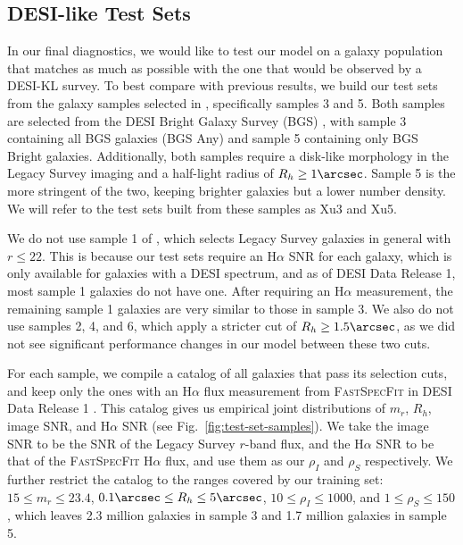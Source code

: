 \subsection{DESI-like Test Sets}
\label{ssec:test-set}

In our final diagnostics, we would like to test our model on a galaxy population that matches as much as possible with the one that would be observed by a DESI-KL survey. To best compare with previous results, we build our test sets from the galaxy samples selected in \citep{KLDESI}, specifically samples 3 and 5. Both samples are selected from the DESI Bright Galaxy Survey (BGS) \citep{BGS}, with sample 3 containing all BGS galaxies (BGS Any) and sample 5 containing only BGS Bright galaxies. Additionally, both samples require a disk-like morphology in the Legacy Survey imaging \citep{LSImaging} and a half-light radius of $R_h \geq 1\arcsec$. Sample 5 is the more stringent of the two, keeping brighter galaxies but a lower number density. We will refer to the test sets built from these samples as Xu3 and Xu5.

We do not use sample 1 of \citep{KLDESI}, which selects Legacy Survey galaxies in general with $r \leq 22$. This is because our test sets require an H$\alpha$ SNR for each galaxy, which is only available for galaxies with a DESI spectrum, and as of DESI Data Release 1, most sample 1 galaxies do not have one. After requiring an H$\alpha$ measurement, the remaining sample 1 galaxies are very similar to those in sample 3. We also do not use samples 2, 4, and 6, which apply a stricter cut of $R_h \geq 1.5\arcsec$, as we did not see significant performance changes in our model between these two cuts.

For each sample, we compile a catalog of all galaxies that pass its selection cuts, and keep only the ones with an H$\alpha$ flux measurement from \textsc{FastSpecFit} \citep{FastSpecFit} in DESI Data Release 1 \citep{DESIDR1}. This catalog gives us empirical joint distributions of $m_r$, $R_h$, image SNR, and H$\alpha$ SNR (see Fig.~\ref{fig:test-set-samples}). We take the image SNR to be the SNR of the Legacy Survey $r$-band flux, and the H$\alpha$ SNR to be that of the \textsc{FastSpecFit} H$\alpha$ flux, and use them as our $\rho_I$ and $\rho_S$ respectively. We further restrict the catalog to the ranges covered by our training set: $15 \leq m_r \leq 23.4$, $0.1\arcsec \leq R_h \leq 5\arcsec$, $10 \leq \rho_I \leq 1000$, and $1 \leq \rho_S \leq 150$, which leaves 2.3 million galaxies in sample 3 and 1.7 million galaxies in sample 5.

